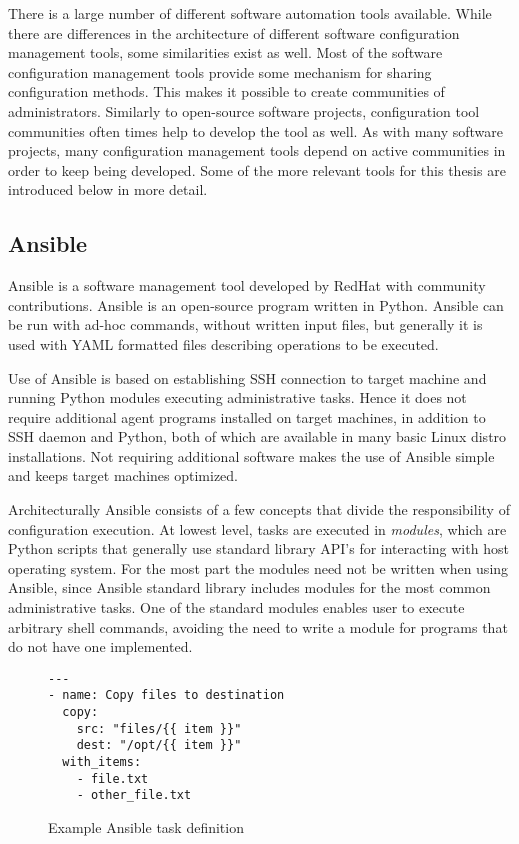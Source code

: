 \documentclass[officiallayout]{tktla}
\begin{document}
There is a large number of different software automation tools available. While
there are differences in the architecture of different software configuration
management tools, some similarities exist as well. Most of the software
configuration management tools provide some mechanism for sharing configuration
methods. This makes it possible to create communities of administrators.
Similarly to open-source software projects, configuration tool communities
often times help to develop the tool as well. As with many software projects,
many configuration management tools depend on active communities in order to
keep being developed. Some of the more relevant tools for this thesis are
introduced below in more detail.

\subsection{Ansible}

Ansible \cite{ansible} is a software management tool developed by RedHat with
community contributions. Ansible is an open-source program written in Python.
Ansible can be run with ad-hoc commands, without written input files, but
generally it is used with YAML formatted files describing operations to be
executed.

Use of Ansible is based on establishing SSH connection to target machine and
running Python modules executing administrative tasks. Hence it does not
require additional  agent programs installed on target machines, in addition to
SSH daemon and Python, both of which are available in many basic Linux distro
installations. Not requiring additional software makes the use of Ansible
simple and keeps target machines optimized.

Architecturally Ansible consists of a few concepts that divide the
responsibility of configuration execution. At lowest level, tasks are executed
in \textit{modules}, which are Python scripts that generally use standard
library API's for interacting with host operating system. For the most part the
modules need not be written when using Ansible, since Ansible standard library
includes modules for the most common administrative tasks. One of the standard
modules enables user to execute arbitrary shell commands, avoiding the need to
write a module for programs that do not have one implemented.

\begin{figure}[t]
\centering
\begin{verbatim}
---
- name: Copy files to destination
  copy:
    src: "files/{{ item }}"
    dest: "/opt/{{ item }}"
  with_items:
    - file.txt
    - other_file.txt
\end{verbatim}

\caption{Example Ansible task definition}
\label{fig:ansible-task}
\end{figure}
\end{document}
